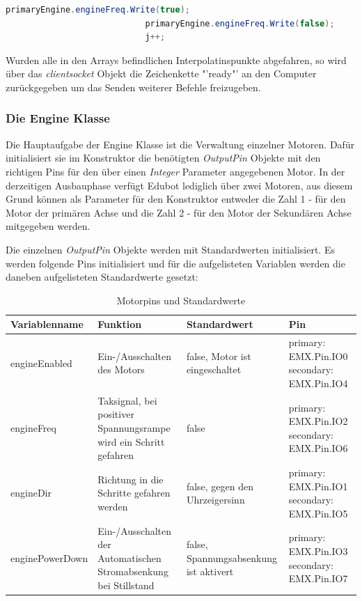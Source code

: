 \begin{itemize}
\begin{lstlisting}[language = csharp, captionpos=b, caption={Beispiel für die Motorsynchronisation}]
                            primaryEngine.engineFreq.Write(true);
                            primaryEngine.engineFreq.Write(false);
                            j++;
\end{lstlisting}

Wurden alle in den Arrays befindlichen Interpolatinspunkte abgefahren, so wird über das \textit{clientsocket} Objekt die Zeichenkette "'ready"' an den Computer zurückgegeben um das Senden weiterer Befehle freizugeben.

\end{itemize}

\subsubsection{Die Engine Klasse}

Die Hauptaufgabe der Engine Klasse ist die Verwaltung einzelner Motoren. Dafür initialisiert sie im Konstruktor die benötigten \textit{OutputPin} Objekte mit den richtigen Pins für den über einen \textit{Integer} Parameter angegebenen Motor. In der derzeitigen Ausbauphase verfügt Edubot lediglich über zwei Motoren, aus diesem Grund können als Parameter für den Konstruktor entweder die Zahl 1 - für den Motor der primären Achse und die Zahl 2 - für den Motor der Sekundären Achse mitgegeben werden.

Die einzelnen \textit{OutputPin} Objekte werden mit Standardwerten initialisiert. Es werden folgende Pins initialisiert und für die aufgelisteten Variablen werden die daneben aufgelisteten Standardwerte gesetzt:

\begin{table}[h]
\begin{tabular}{|p{3cm}|p{3.5cm}|p{3.5cm}|p{3.5cm}|}
\hline \rowcolor{lightgray}
\textbf{Variablenname} & \textbf{Funktion} & \textbf{Standardwert} &\textbf{Pin}\\
\hline
engineEnabled & Ein-/Ausschalten des Motors & false, Motor ist eingeschaltet & primary: EMX.Pin.IO0 secondary: EMX.Pin.IO4\\
\hline
engineFreq & Taksignal, bei positiver Spannungsrampe wird ein Schritt gefahren & false & primary: EMX.Pin.IO2 secondary: EMX.Pin.IO6\\
\hline
engineDir & Richtung in die Schritte gefahren werden & false, gegen den Uhrzeigersinn & primary: EMX.Pin.IO1 secondary: EMX.Pin.IO5\\
\hline
enginePowerDown & Ein-/Ausschalten der Automatischen Stromabsenkung bei Stillstand & false, Spannungsabsenkung ist aktivert & primary: EMX.Pin.IO3 secondary: EMX.Pin.IO7\\
\hline
\end{tabular}
\caption{Motorpins und Standardwerte}
\end{table}


